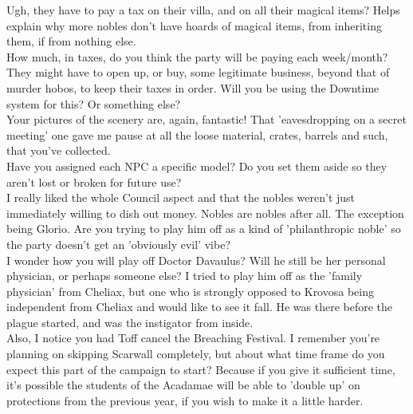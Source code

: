 Ugh, they have to pay a tax on their villa, and on all their magical items? Helps explain why more nobles don't have hoards of magical items, from inheriting them, if from nothing else.\\

How much, in taxes, do you think the party will be paying each week/month? They might have to open up, or buy, some legitimate business, beyond that of murder hobos, to keep their taxes in order. Will you be using the Downtime system for this? Or something else?\\

Your pictures of the scenery are, again, fantastic! That 'eavesdropping on a secret meeting' one gave me pause at all the loose material, crates, barrels and such, that you've collected.\\

Have you assigned each NPC a specific model? Do you set them aside so they aren't lost or broken for future use?\\

 I really liked the whole Council aspect and that the nobles weren't just immediately willing to dish out money. Nobles are nobles after all. The exception being Glorio. Are you trying to play him off as a kind of 'philanthropic noble' so the party doesn't get an 'obviously evil' vibe?\\

I wonder how you will play off Doctor Davaulus? Will he still be her personal physician, or perhaps someone else? I tried to play him off as the 'family physician' from Cheliax, but one who is strongly opposed to Krovosa being independent from Cheliax and would like to see it fall. He was there before the plague started, and was the instigator from inside.\\

Also, I notice you had Toff cancel the Breaching Festival. I remember you're planning on skipping Scarwall completely, but about what time frame do you expect this part of the campaign to start? Because if you give it sufficient time, it's possible the students of the Acadamae will be able to 'double up' on protections from the previous year, if you wish to make it a little harder.\\

